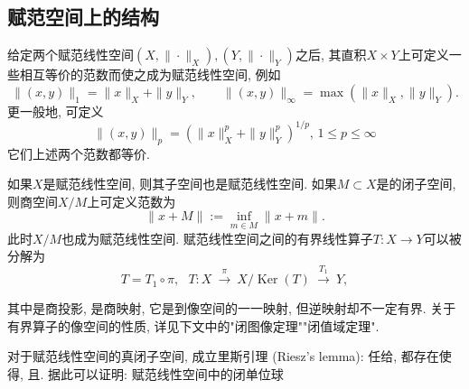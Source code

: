 \subsection{赋范空间上的结构}
给定两个赋范线性空间$(X,\|\cdot\|_X),(Y,\|\cdot\|_Y)$之后, 其直积$X\times Y$上可定义一些相互等价的范数而使之成为赋范线性空间, 例如
$$
\|(x,y)\|_{1}=\|x\|_X+\|y\|_Y,\qquad \|(x,y)\|_{\infty }=\max(\|x\|_X,\|y\|_Y).
$$
更一般地, 可定义
$$
\|(x,y)\|_{p}=\left(\|x\|_X^p+\|y\|_Y^p\right)^{1/p},\,1\leq p\leq\infty
$$
它们上述两个范数都等价.

如果$X$是赋范线性空间, 则其子空间也是赋范线性空间. 如果$M\subset X$是的闭子空间, 则商空间$X/M$上可定义范数为
$$
\|x+M\|:=\inf \limits _{m\in M}\|x+m\|.
$$
此时$X/M$也成为赋范线性空间. 赋范线性空间之间的有界线性算子$T:X\to Y$可以被分解为
$$
T=T_{1}\circ \pi ,\ \ \ T:X\ {\overset {\pi }{\longrightarrow }}\ X/\operatorname {Ker} (T)\ {\overset {T_{1}}{\longrightarrow }}\ Y,
$$

其中是商投影, 是商映射, 它是到像空间的一一映射, 但逆映射却不一定有界. 关于有界算子的像空间的性质, 详见下文中的"闭图像定理""闭值域定理".

        对于赋范线性空间的真闭子空间, 成立里斯引理 (Riesz's lemma): 任给, 都存在使得, 且. 据此可以证明: 赋范线性空间中的闭单位球
